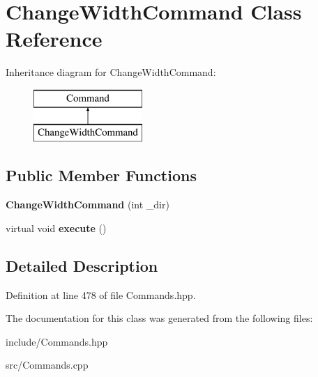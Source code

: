 \hypertarget{class_change_width_command}{}\section{Change\+Width\+Command Class Reference}
\label{class_change_width_command}
Inheritance diagram for Change\+Width\+Command\+:\begin{figure}[H]
\begin{center}
\leavevmode
\includegraphics[height=2.000000cm]{class_change_width_command}
\end{center}
\end{figure}
\subsection*{Public Member Functions}
\begin{DoxyCompactItemize}
\item 
\hypertarget{class_change_width_command_a6d3a88591342b316c84ac547871662b9}{}{\bfseries Change\+Width\+Command} (int \+\_\+dir)\label{class_change_width_command_a6d3a88591342b316c84ac547871662b9}

\item 
\hypertarget{class_change_width_command_afc97827d09426fb9e4a12bc6d88b0fcb}{}virtual void {\bfseries execute} ()\label{class_change_width_command_afc97827d09426fb9e4a12bc6d88b0fcb}

\end{DoxyCompactItemize}


\subsection{Detailed Description}


Definition at line 478 of file Commands.\+hpp.



The documentation for this class was generated from the following files\+:\begin{DoxyCompactItemize}
\item 
include/Commands.\+hpp\item 
src/Commands.\+cpp\end{DoxyCompactItemize}
